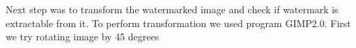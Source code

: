 \documentclass[a4paper, 12pt]{article}
\begin{document}
        \begin{figure}[!h]%
        	\centering
        	\qquad
        	\label{fig:python_logo}%
        \end{figure}


        \begin{figure}[!h]%
			\centering
			\qquad
			\label{fig:python_logo2}%
		\end{figure}
	\newpage
        
    	Next step was to transform the watermarked image and check if watermark is extractable from it. To perform transformation we used program GIMP2.0. First we try rotating image by 45 degrees %
\end{document}
